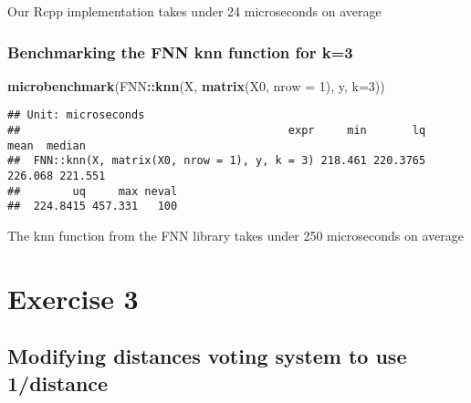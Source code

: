 \documentclass[]{article}
\newenvironment{Shaded}{\begin{snugshade}}{\end{snugshade}}
\newcommand{\DataTypeTok}[1]{\textcolor[rgb]{0.13,0.29,0.53}{#1}}
\newcommand{\DecValTok}[1]{\textcolor[rgb]{0.00,0.00,0.81}{#1}}
\newcommand{\KeywordTok}[1]{\textcolor[rgb]{0.13,0.29,0.53}{\textbf{#1}}}
\newcommand{\NormalTok}[1]{#1}
\newcommand{\OperatorTok}[1]{\textcolor[rgb]{0.81,0.36,0.00}{\textbf{#1}}}
\begin{document}
Our Rcpp implementation takes under 24 microseconds on average

\hypertarget{benchmarking-the-fnn-knn-function-for-k3}{%
\subsubsection{Benchmarking the FNN knn function for
k=3}\label{benchmarking-the-fnn-knn-function-for-k3}}

\begin{Shaded}
\begin{Highlighting}[]
\KeywordTok{microbenchmark}\NormalTok{(FNN}\OperatorTok{::}\KeywordTok{knn}\NormalTok{(X, }\KeywordTok{matrix}\NormalTok{(X0, }\DataTypeTok{nrow =} \DecValTok{1}\NormalTok{), y, }\DataTypeTok{k=}\DecValTok{3}\NormalTok{))}
\end{Highlighting}
\end{Shaded}

\begin{verbatim}
## Unit: microseconds
##                                         expr     min       lq    mean  median
##  FNN::knn(X, matrix(X0, nrow = 1), y, k = 3) 218.461 220.3765 226.068 221.551
##        uq     max neval
##  224.8415 457.331   100
\end{verbatim}

The knn function from the FNN library takes under 250 microseconds on
average

\newpage

\hypertarget{exercise-3}{%
\section{Exercise 3}\label{exercise-3}}

\hypertarget{modifying-distances-voting-system-to-use-1distance}{%
\subsection{Modifying distances voting system to use
1/distance}\label{modifying-distances-voting-system-to-use-1distance}}
\end{document}
